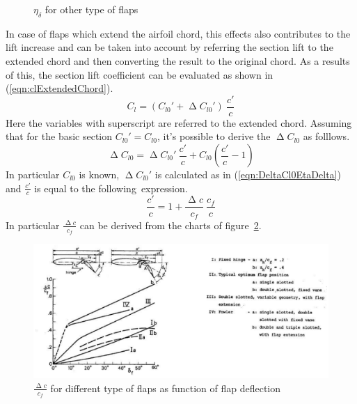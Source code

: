 %
\begin{figure}[!b]
\centering
{}
\caption{$\eta_\delta$ for other type of flaps}
\label{fig:EtaDelta}
\end{figure}
%
\noindent
In case of flaps which extend the airfoil chord, this effects also contributes to the lift increase and can be taken into account by referring the section lift to the extended chord and then converting the result to the original chord. As a results of this, the section lift coefficient can be evaluated as shown in (\ref{eqn:clExtendedChord}).
%
\begin{equation}
C_{l}=\left(C_{l0}'+\upDelta C_{l0}'\right)\ \frac{c'}{c}
\label{eqn:clExtendedChord}
\end{equation}
%
\noindent 
Here the variables with superscript are referred to the extended chord. Assuming that for the basic section $C_{l0}'=C_{l0}$, it's possible to derive the $\upDelta C_{l0}$ as folllows.
%
\begin{equation}
\upDelta C_{l0}=\upDelta C_{l0}'\ \frac{c'}{c}+C_{l0}\left(\frac{c'}{c}-1\right)
\label{eqn:Deltacl0Final}
\end{equation}
%
\noindent
In particular $C_{l0}$ is known, $\upDelta C_{l0}'$ is calculated as in (\ref{eqn:DeltaCl0EtaDelta}) and $\frac{c'}{c}$ is equal to the following~expression.
%
\begin{equation}
\frac{c'}{c}=1+\frac{\upDelta c}{c_f}\ \frac{c_f}{c}
\label{eqn:c'/c}
\end{equation}
%
\noindent
In particular $\frac{\upDelta c}{c_f}$ can be derived from the charts of figure~\ref{fig:DeltaCCf}.
%
\begin{figure}[!t]
  \centering
  \includegraphics[width=\linewidth, angle=0.5]{DeltaC_Cf}
  \caption{$\frac{\upDelta c}{c_f}$ for different type of flaps as function of flap deflection}
  \label{fig:DeltaCCf}
\end{figure}
